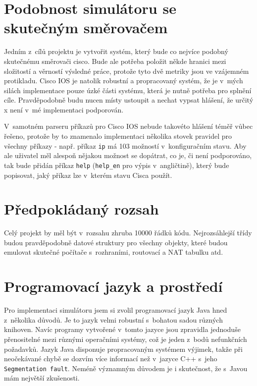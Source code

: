 
\section{Podobnost simulátoru se skutečným směrovačem}\label{kap:podobnost}
Jedním z~cílů projektu je vytvořit systém, který bude co nejvíce podobný skutečnému směrovači cisco. Bude ale potřeba položit někde hranici mezi složitostí a věrností výsledné práce, protože tyto dvě metriky jsou ve vzájemném protikladu. Cisco IOS je natolik robustní a propracovaný systém, že je v~mých silách implementace pouze úzké části systému, která je nutně potřeba pro splnění cíle. Pravděpodobně budu nucen místy ustoupit a nechat vypsat hlášení, že určitý x není v~mé implementaci podporován. 

V~samotném parseru příkazů pro Cisco IOS nebude takovéto hlášení téměř vůbec řešeno, protože by to znamenalo implementaci několika stovek pravidel pro všechny příkazy - např. příkaz \verb|ip| má 103 možností v~konfiguračním stavu. Aby ale uživatel měl alespoň nějakou možnost se dopátrat, co je, či není podporováno, tak bude přidán příkaz \verb|help| (\verb|help_en| pro výpis v~angličtině), který bude popisovat, jaký příkaz lze v~kterém stavu Cisca použít.


\section{Předpokládaný rozsah}
Celý projekt by měl být v~rozsahu zhruba 10000 řádků kódu. Nejrozsáhlejší třídy budou pravděpodobně datové struktury pro všechny objekty, které budou emulovat skutečné počítače s~rozhraními, routovací a NAT tabulku atd.


\section{Programovací jazyk a prostředí}
Pro implementaci simulátoru jsem si zvolil programovací jazyk Java hned z~několika důvodů. Je to jazyk velmi robustní s~bohatou sadou různých knihoven. Navíc programy vytvořené v~tomto jazyce jsou zpravidla jednoduše přenositelné mezi různými operačními systémy, což je jeden z~bodů nefunkčních požadavků. Jazyk Java disponuje propracovaným systémem výjimek, takže při neočekávané chybě se dozvím více informací než v~jazyce C++ s~jeho \verb|Segmentation fault|. Neméně významným důvodem je i skutečnost, že s~Javou mám největší zkušenosti.

